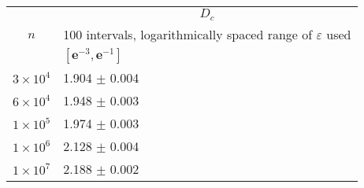 \begin{center}
\begin{tabular}{ |l|l| }
\hline
\multicolumn{1}{|c|}{\multirow{3}{*}{$n$}} & \multicolumn{1}{|c|}{$D_{c} $}\\
\cline{2-2}
&\multicolumn{1}{|c|}{100 intervals, logarithmically spaced range of $\varepsilon$ used}\\
\cline{2-2}
 &\rule{0pt}{12pt}  \hspace{85pt} $[\boldsymbol{e}^{-3},\boldsymbol{e}^{-1}]$  \\
\hline
$3\times 10^{4}$ & \hspace{80pt} 1.904 $\pm$ 0.004  \\
\hline
$6\times 10^{4}$ & \hspace{80pt} 1.948 $\pm$ 0.003 \\
\hline
$1\times 10^{5}$ & \hspace{80pt} 1.974 $\pm$ 0.003 \\
\hline
$1\times 10^{6}$ & \hspace{80pt} 2.128 $\pm$ 0.004  \\
\hline
$1\times 10^{7}$ & \hspace{80pt} 2.188 $\pm$ 0.002  \\
\hline
\end{tabular}
\end{center}


